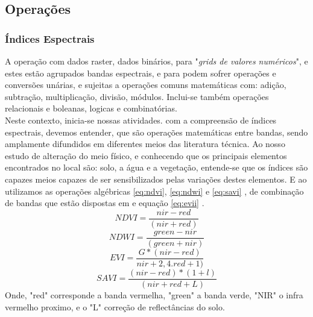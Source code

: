   \subsection{Operações}  
    \subsubsection{Índices Espectrais}
 \hspace*{1.25 cm} A operação com dados raster, dados binários, para \cite[106]{Dormam} "\textit{grids de valores numéricos}", e estes estão agrupados bandas espectrais, e para \cite[p.178 e p.181]{Liu}  podem sofrer operações e conversões unárias, e sujeitas a operações comuns matemáticas com: adição, subtração, multiplicação, divisão, módulos. Inclui-se também operações relacionais e boleanas, logicas e combinatórias.  \\
 \hspace*{1.25 cm}  Neste contexto, inicia-se nossas atividades. com a compreensão de índices espectrais, devemos entender, que são operações matemáticas entre bandas, sendo amplamente difundidos em diferentes meios das literatura técnica. Ao nosso estudo de alteração do meio físico, e conhecendo que os principais elementos encontrados no local são: solo, a água e a vegetação, entende-se  que  os índices  são capazes meios capazes de ser sensibilizados pelas variações destes elementos. E ao utilizamos as operações algébricas  \eqref{eq:ndvi}, \eqref{eq:ndwi} e \eqref{eq:savi} , de combinação de bandas que estão dispostas em \cite[p.165]{Thekapbail} e equação  \eqref{eq:evii} \cite[p.7]{Thekapbail}. 
 \begin{equation} \label{eq:ndvi}
 	 NDVI = \dfrac{nir - red}{ (nir + red) }
 \end{equation}
 \begin{equation}\label{eq:ndwi}
	NDWI = \dfrac{green - nir}{ (green + nir) }
\end{equation}
 \begin{equation}\label{eq:evii}
	EVI = \dfrac{G*(nir - red)}{ nir + 2,4. red +1) }
\end{equation}
 \begin{equation}\label{eq:savi}
	SAVI = \dfrac{(nir - red)*(1 +l)}{ (nir + red +L) }
\end{equation}
%
\hspace*{1.25 cm} Onde, "red" corresponde a banda vermelha, "green" a banda verde, "NIR" o infra vermelho proximo, e o "L" correção de reflectâncias do solo.\\
